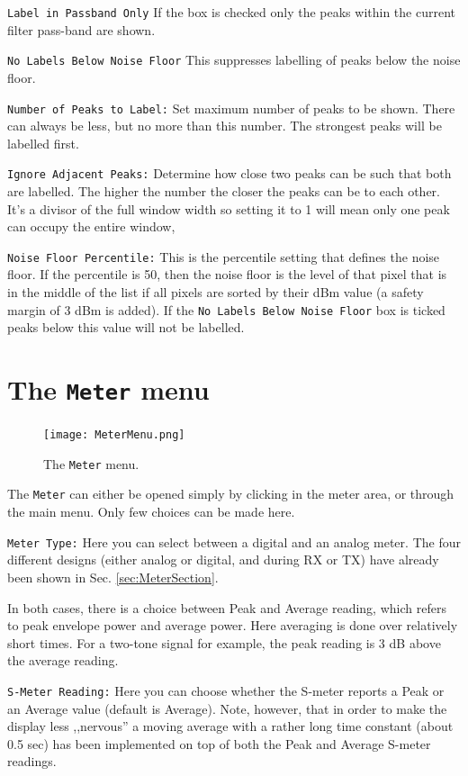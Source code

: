 \documentclass[12pt]{book}
\def\rett#1{\texttt{\color{red}#1}}
\def\bltt#1{\texttt{\color{blue}#1}}
\begin{document}
\rett{Label in Passband Only} If the box is checked only the peaks within the
current filter pass-band  are shown.

\rett{No Labels Below Noise Floor} This suppresses labelling of peaks below the noise floor.

\rett{Number of Peaks to Label:} Set maximum number of peaks to be shown. There can always be less,
but no more than this number. The strongest peaks will be labelled first.

\rett{Ignore Adjacent Peaks:} Determine how close two peaks can be such that both are labelled.
The higher the number the closer the peaks can be to each other. It's a divisor of the
full window width so setting it to 1 will mean only one peak can occupy the entire window,

\rett{Noise Floor Percentile:} This is the percentile setting that defines the noise floor. If the
percentile is 50, then the noise floor is the level of that pixel that is in the middle of the list
if all pixels are sorted by their dBm value (a safety margin of 3 dBm is added).
If the \rett{No Labels Below Noise Floor} box is ticked
peaks below this value will not be labelled.


\section{The \texttt{Meter} menu}

\begin{figure}[ht]
\center
\texttt{[image: MeterMenu.png]}
\caption{The \bltt{Meter} menu.}
\label{fig:Meter}
\end{figure}

The \bltt{Meter} can either be opened simply by clicking in the meter
area, or through the main menu. Only few choices can be made here.

\rett{Meter Type:} Here you can select between a digital and an analog
meter. The four different designs (either analog or digital, and during
RX or TX) have already been shown in Sec. \ref{sec:MeterSection}.

In both cases, there is a choice between Peak and Average reading, which
refers to peak envelope power and average power. Here averaging is done
over relatively short times. For a two-tone signal for example, the peak
reading is 3 dB above the average reading.

\rett{S-Meter Reading:} Here you can choose whether the S-meter reports
a Peak or an Average value (default is Average).
Note, however, that in order to make the
display less ,,nervous'' a moving average with a rather long time constant
(about 0.5 sec) has been implemented on top of both the Peak and Average
S-meter readings.
\end{document}
